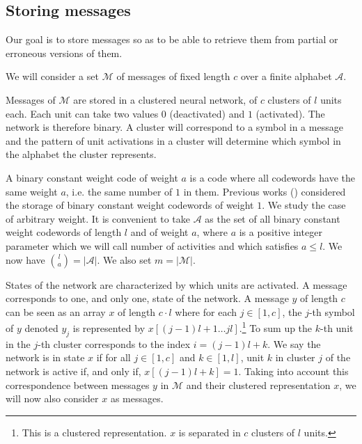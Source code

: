 \documentclass[english,10pt,twocolumn]{IEEEtran}
\renewcommand{\le}{\leqslant}
\theoremstyle{definition}
\begin{document}
	
	\subsection{Storing messages}
	
	Our goal is to store messages so as to be able to retrieve them from partial or erroneous versions of them.
	
	We will consider a set $\mathcal{M}$ of messages of fixed length $c$ over a finite alphabet $\mathcal{A}$.
	
	Messages of $\mathcal{M}$ are stored in a clustered neural network, of $c$ clusters of $l$ units each. Each unit can take two values $0$ (deactivated) and $1$ (activated). The network is therefore binary. A cluster will correspond to a symbol in a message and the pattern of unit activations in a cluster will determine which symbol in the alphabet the cluster represents. 
	
	A binary constant weight code of weight $a$ is a code where all codewords have the same weight $a$, i.e. the same number of $1$ in them. Previous works (\cite{GriBer20114, GriBer20122}) considered the storage of binary constant weight codewords of weight $1$. We study the case of arbitrary weight. It is convenient to take $\mathcal{A}$ as the set of all binary constant weight codewords of length $l$ and of weight $a$, where $a$ is a positive integer parameter which we will call number of activities and which satisfies $a\le l$. We now have ${l \choose a} = |\mathcal{A}|$. We also set $m = | \mathcal{M} |$.
	
	 
	
	
	States of the network are characterized by which units are activated. A message corresponds to one, and only one, state of the network. A message $y$ of length $c$ can be seen as an array $x$ of length $c\cdot{} l$ where for each $j\in [1,c]$, the $j$-th symbol of $y$ denoted $y_j$ is represented by $x[(j-1)l+1\hdots jl]$.\footnote{This is a clustered representation. $x$ is separated in $c$ clusters of $l$ units.} To sum up the $k$-th unit in the $j$-th cluster corresponds to the index $i = (j-1)l+k$. We say the network is in state $x$ if for all $j\in [1, c]$ and $k\in [1,l]$, unit $k$ in cluster $j$ of the network is active if, and only if, $x[(j-1)l+k] = 1$. Taking into account this correspondence between messages $y$ in $\mathcal{M}$ and their clustered representation $x$, we will now also consider $x$ as messages.
	
\end{document}
